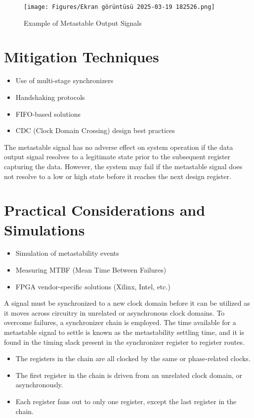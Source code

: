 \documentclass{article}
\begin{document}
\begin{figure}[htbp]
    \centering
    \texttt{[image: Figures/Ekran görüntüsü 2025-03-19 182526.png]}
    \caption{Example of Metastable Output Signals}
    \label{fig:enter-label}
\end{figure}

\section{Mitigation Techniques}
\begin{itemize}
    \item Use of multi-stage synchronizers
    \item Handshaking protocols
    \item FIFO-based solutions
    \item CDC (Clock Domain Crossing) design best practices
\end{itemize}
The metastable signal has no adverse effect on system operation if the data output signal resolves to a legitimate state prior to the subsequent register capturing the data. However, the system may fail if the metastable signal does not resolve to a low or high state before it reaches the next design register.

\section{Practical Considerations and Simulations}
\begin{itemize}
    \item Simulation of metastability events
    \item Measuring MTBF (Mean Time Between Failures)
    \item FPGA vendor-specific solutions (Xilinx, Intel, etc.)
\end{itemize}
A signal must be synchronized to a new clock domain before it can be utilized as it moves across circuitry in unrelated or asynchronous clock domains. To overcome failures, a synchronizer chain is employed. The time available for a metastable signal to settle is known as the metastability settling time, and it is found in the timing slack present in the synchronizer register to register routes.

\begin{itemize}
    \item The registers in the chain are all clocked by the same or phase-related clocks.
    \item The first register in the chain is driven from an unrelated clock domain, or asynchronously.
    \item Each register fans out to only one register, except the last register in the chain.
\end{itemize}
\end{document}
